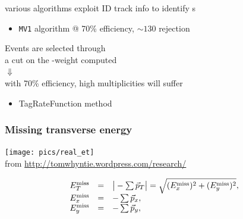 \begin{frame}
\begin{minipage}{.4\textwidth}
various algorithms exploit ID track info to identify \bjet s

\begin{itemize}
\item \texttt{\cccolor MV1} algorithm @ 70\% efficiency, $\sim 130$ rejection
\end{itemize}

\end{minipage}\begin{minipage}{.6\textwidth}\centering

Events are selected through \\a cut on the \btag-weight computed\\
{\large$\Downarrow$}\\
with 70\% efficiency, high multiplicities will suffer

\begin{itemize}
\item {\cccolor TagRateFunction} method
\end{itemize}


\end{minipage}


\end{frame}



\begin{frame}\frametitle{Missing transverse energy}
\centering\myskip

\begin{minipage}{.5\textwidth}\centering

\texttt{[image: pics/real\_et]}\\
{\tiny from \url{http://tomwhyntie.wordpress.com/research/}}

\end{minipage}\begin{minipage}{.5\textwidth}\centering
\end{minipage}
$$\begin{array}{lcl}
E^{\rm miss}_{T} & = & \big|-\sum\vec{p}_T \big| = \sqrt{(E^{\rm miss}_{x})^2 + (E^{\rm miss}_{y})^2} ,\\
E^{\rm miss}_{x} & = & -\sum\vec{p}_x ,\\
E^{\rm miss}_{y} & = & -\sum\vec{p}_y ,\\
\end{array}$$


\end{frame}

